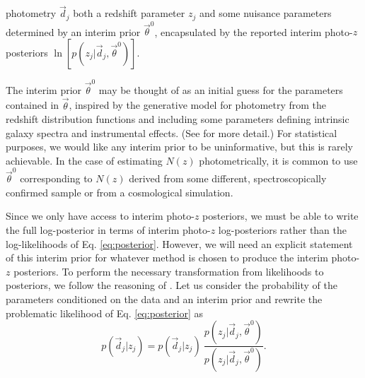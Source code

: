 \documentclass[preprint]{aastex}
\begin{document}
photometry $\vec{d}_{j}$ both a redshift parameter $z_{j}$ and some nuisance 
parameters determined by an interim prior $\vec{\theta}^{0}$, encapsulated by 
the reported interim photo-$z$ posteriors 
$\ln[p(z_{j}|\vec{d}_{j},\vec{\theta}^{0})]$.  

The interim prior $\vec{\theta}^{0}$ may be thought of as an initial guess for 
the parameters contained in $\vec{\theta}$, inspired by the generative model 
for photometry from the redshift distribution functions and including some 
parameters defining intrinsic galaxy spectra and instrumental effects. (See 
\citealt{Benitez2000} for more detail.)  For statistical purposes, we would 
like any interim prior to be uninformative, but this is rarely achievable.  In 
the case of estimating $N(z)$ photometrically, it is common to use 
$\vec{\theta}^{0}$ corresponding to $N(z)$ derived from some different, 
spectroscopically confirmed sample or from a cosmological simulation.

Since we only have access to interim photo-$z$ posteriors, we must be able to 
write the full log-posterior in terms of interim photo-$z$ log-posteriors 
rather than the log-likelihoods of Eq. \ref{eq:posterior}.  However, we will 
need an explicit statement of this interim prior for whatever method is chosen 
to produce the interim photo-$z$ posteriors.  To perform the necessary 
transformation from likelihoods to posteriors, we follow the reasoning of 
\citet{Marshall2015}.  Let us consider the probability of the parameters 
conditioned on the data and an interim prior and rewrite the problematic 
likelihood of Eq. \ref{eq:posterior} as \begin{equation}\label{eq:trick} 
p(\vec{d}_{j}|z_{j}) = p(\vec{d}_{j}|z_{j})\ 
\frac{p(z_{j}|\vec{d}_{j},\vec{\theta}^{0})}{p(z_{j}|\vec{d}_{j},\vec{\theta}^{0
})}.\end{equation}
\end{document}
